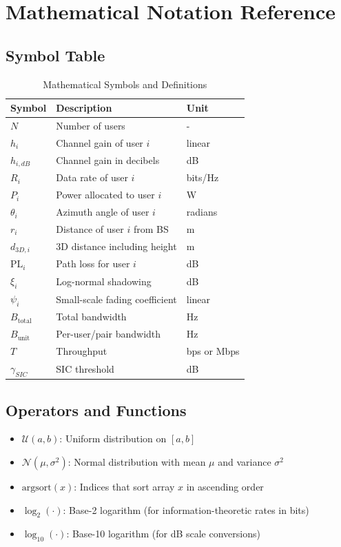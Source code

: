 \documentclass[12pt,a4paper]{article}
\begin{document}
\section{Mathematical Notation Reference}

\subsection{Symbol Table}

\begin{table}[h]
\centering
\caption{Mathematical Symbols and Definitions}
\begin{tabular}{lll}
\toprule
\textbf{Symbol} & \textbf{Description} & \textbf{Unit} \\
\midrule
$N$ & Number of users & - \\
$h_i$ & Channel gain of user $i$ & linear \\
$h_{i,dB}$ & Channel gain in decibels & dB \\
$R_i$ & Data rate of user $i$ & bits/Hz \\
$P_i$ & Power allocated to user $i$ & W \\
$\theta_i$ & Azimuth angle of user $i$ & radians \\
$r_i$ & Distance of user $i$ from BS & m \\
$d_{3D,i}$ & 3D distance including height & m \\
$\text{PL}_i$ & Path loss for user $i$ & dB \\
$\xi_i$ & Log-normal shadowing & dB \\
$\psi_i$ & Small-scale fading coefficient & linear \\
$B_{\text{total}}$ & Total bandwidth & Hz \\
$B_{\text{unit}}$ & Per-user/pair bandwidth & Hz \\
$T$ & Throughput & bps or Mbps \\
$\gamma_{SIC}$ & SIC threshold & dB \\
\bottomrule
\end{tabular}
\end{table}

\subsection{Operators and Functions}

\begin{itemize}
    \item $\mathcal{U}(a,b)$: Uniform distribution on $[a,b]$
    \item $\mathcal{N}(\mu, \sigma^2)$: Normal distribution with mean $\mu$ and variance $\sigma^2$
    \item $\text{argsort}(x)$: Indices that sort array $x$ in ascending order
    \item $\log_2(\cdot)$: Base-2 logarithm (for information-theoretic rates in bits)
    \item $\log_{10}(\cdot)$: Base-10 logarithm (for dB scale conversions)
\end{itemize}
\end{document}
